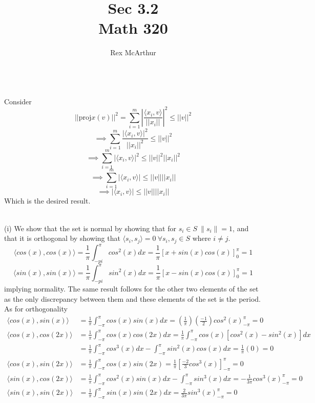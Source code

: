 \documentclass[letterpaper,12pt]{article}
\title{Sec 3.2 \\Math 320}
\author{Rex McArthur}
\theoremstyle{definition}
\begin{document}
\maketitle
{}\\

Consider 
\[ ||\text{proj}x(v) ||^2 = \sum^{m}_{i=1} \left| \frac{\langle x_i,v \rangle}{||x_i||}\right|^2 \leq ||v||^2\]
\[\implies \sum^{m}_{i=1}  \frac{|\langle x_i,v \rangle|^2}{||x_i||^2} \leq ||v||^2\]
\[\implies \sum^{m}_{i=1}  |\langle x_i,v \rangle|^2 \leq ||v||^2||x_i||^2\]
\[\implies \sum^{m}_{i=1}  |\langle x_i,v \rangle| \leq ||v||||x_i||\]
\[\implies   |\langle x_i,v \rangle| \leq ||v||||x_i||\]
Which is the desired result.


\\
(i)
We show that the set is normal by showing that for $s_i \in S ~ \|s_i\| = 1$, and that it is orthogonal by showing that $\langle s_{i}, s_{j} \rangle = 0 ~ \forall s_{i}, s_{j} \in S$ where $ i \neq j$.\\
\[\langle  cos(x), cos(x)\rangle   = \frac{1}{\pi}\int ^{\pi}_{-pi} cos^2(x)dx = \frac{1}{\pi}[x+sin(x)cos(x)]^\pi_0 = 1\]
\[\langle  sin(x), sin(x)\rangle   = \frac{1}{\pi}\int ^{\pi}_{-pi} sin^2(x)dx = \frac{1}{\pi}[x-sin(x)cos(x)]^\pi_0 = 1\]
implying normality.
The same result follows for the other two elements of the set as the only discrepancy between them and these elements of the set is the period. As for orthogonality
\begin{align*}
\langle  cos(x), sin(x)\rangle   &= \frac{1}{\pi}\int ^\pi_{-\pi} cos(x)sin(x)dx = (\frac{1}{\pi})(\frac{-1}{2}) cos^2(x)_{-\pi}^\pi = 0 \\
\langle  cos(x), cos(2x)\rangle   &= \frac{1}{\pi}\int_{-\pi}^{\pi}cos(x)cos(2x)dx=\frac{1}{\pi}\int_{-\pi}^{\pi}cos(x)[cos^2(x)-sin^2(x)]dx \\
&=\frac{1}{\pi}\int_{-\pi}^{\pi}cos^3(x)dx-\int_{-\pi}^{\pi}sin^2(x)cos(x)dx = \frac{1}{\pi}(0)=0 \\
\langle  cos(x), sin(2x) \rangle   &= \frac{1}{\pi}\int_{-\pi}^{\pi}cos(x)sin(2x)=\frac{1}{\pi}[\frac{-2}{3}cos^3(x)]_{-\pi}^\pi=0 \\
\langle  sin(x), cos(2x) \rangle   &= \frac{1}{\pi}\int_{-\pi}^{\pi}cos^2(x)sin(x)dx-\int_{-\pi}^{\pi}sin^3(x)dx= -\frac{1}{3\pi}cos^3(x)_{-\pi}^\pi = 0 \\
\langle  sin(x),sin(2x)\rangle  &= \frac{1}{\pi}\int_{-\pi}^{\pi}sin(x)sin(2x)dx=\frac{2}{3\pi}sin^3(x)_{-\pi}^\pi = 0 \\
\end{align*}
\end{document}
